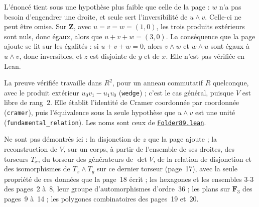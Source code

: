 \begin{remarque}
L'énoncé tient sous une hypothèse plus faible que celle de la page : $w$ n'a pas besoin d'engendrer une droite, et seule sert l'inversibilité de $u \wedge v$. Celle-ci ne peut être omise. Sur $\mathbf Z$, avec $u = v = w = (1, 0)$, les trois produits extérieurs sont nuls, donc égaux, alors que $u + v + w = (3, 0)$. La conséquence que la page ajoute se lit sur les égalités : si $u + v + w = 0$, alors $v \wedge w$ et $w \wedge u$ sont égaux à $u \wedge v$, donc inversibles, et $z$ est disjointe de $y$ et de $x$. Elle n'est pas vérifiée en Lean.
\end{remarque}

\noindent La preuve vérifiée travaille dans $R^2$, pour un anneau commutatif $R$ quelconque, avec le produit extérieur $u_0 v_1 - u_1 v_0$ (\texttt{wedge}) ; c'est le cas général, puisque $V$ est libre de rang~$2$. Elle établit l'identité de Cramer coordonnée par coordonnée (\texttt{cramer}), puis l'équivalence sous la seule hypothèse que $u \wedge v$ est une unité (\texttt{fundamental\_relation}). Les noms sont ceux de \href{\leanblobmain/Combinatorics/Folder89.lean}{\texttt{Folder89.\allowbreak{}lean}}.

Ne sont pas démontrés ici : la disjonction de $z$ que la page ajoute ; la reconstruction de $V$, sur un corps, à partir de l'ensemble de ses droites, des torseurs $T_x$, du torseur des générateurs de $\det V$, de la relation de disjonction et des isomorphismes de $T_x \wedge T_y$ sur ce dernier torseur (page~17), avec la seule propriété de ces données que la page~18 écrit ; les hexagones et les ensembles 3-3 des pages~2 à~8, leur groupe d'automorphismes d'ordre~$36$ ; les plans sur $\mathbf F_3$ des pages~9 à~14 ; les polygones combinatoires des pages~19 et~20.
